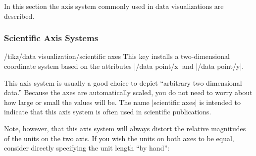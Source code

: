 In this section the axis system commonly used in data visualizations
are described.

\subsubsection{Scientific Axis Systems}

\begin{key}{/tikz/data visualization/scientific axes}
  This key installs a two-dimensional coordinate system based on the
  attributes |/data point/x| and |/data point/y|.

\begin{codeexample}[]
\end{codeexample}

  This axis system is usually a good choice to depict ``arbitrary two
  dimensional data.'' Because the axes are automatically scaled, you
  do not need to worry about how large or small the values will
  be. The name |scientific axes| is intended to indicate that this
  axis system is often used in scientific publications.

  Note, however, that this axis system will always distort the
  relative magnitudes of the units on the two axis. If you wish the
  units on both axes to be equal, consider directly specifying the
  unit length ``by hand'':

\begin{codeexample}[]
\end{codeexample}


\end{key}
